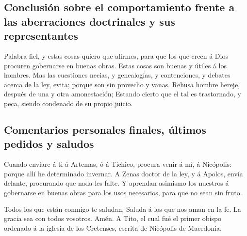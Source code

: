 \hypertarget{conclusiuxf3n-sobre-el-comportamiento-frente-a-las-aberraciones-doctrinales-y-sus-representantes}{%
\subsection{Conclusión sobre el comportamiento frente a las aberraciones
doctrinales y sus
representantes}\label{conclusiuxf3n-sobre-el-comportamiento-frente-a-las-aberraciones-doctrinales-y-sus-representantes}}

 Palabra fiel, y estas cosas quiero que afirmes, para que
los que creen á Dios procuren gobernarse en buenas obras. Estas cosas
son buenas y útiles á los hombres.  Mas las cuestiones
necias, y genealogías, y contenciones, y debates acerca de la ley,
evita; porque son sin provecho y vanas.  Rehusa hombre
hereje, después de una y otra amonestación;  Estando cierto
que el tal es trastornado, y peca, siendo condenado de su propio juicio.

\hypertarget{comentarios-personales-finales-uxfaltimos-pedidos-y-saludos}{%
\subsection{Comentarios personales finales, últimos pedidos y
saludos}\label{comentarios-personales-finales-uxfaltimos-pedidos-y-saludos}}

 Cuando enviare á ti á Artemas, ó á Tichîco, procura venir
á mí, á Nicópolis: porque allí he determinado invernar.  A
Zenas doctor de la ley, y á Apolos, envía delante, procurando que nada
les falte.  Y aprendan asimismo los nuestros á gobernarse
en buenas obras para los usos necesarios, para que no sean sin fruto.

 Todos los que están conmigo te saludan. Saluda á los que
nos aman en la fe. La gracia sea con todos vosotros. Amén. A Tito, el
cual fué el primer obispo ordenado á la iglesia de los Cretenses,
escrita de Nicópolis de Macedonia.
